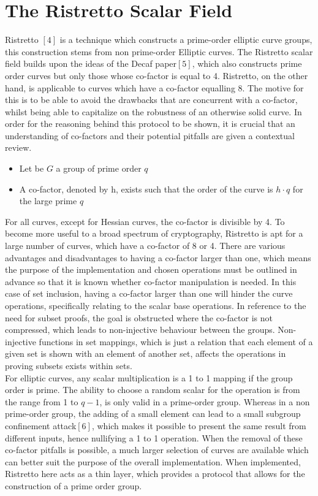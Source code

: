 \documentclass{article}
\begin{document}
\section{The Ristretto Scalar Field}
Ristretto $[4]$ is a technique which constructs a prime-order elliptic curve groups, this construction stems from non prime-order Elliptic curves. The Ristretto scalar field builds upon the ideas of the Decaf paper$[5]$, which also constructs prime order curves but only those whose co-factor is equal to 4. Ristretto, on the other hand, is applicable to curves which have a co-factor equalling 8. The motive for this is to be able to avoid the drawbacks that are concurrent with a co-factor, whilst being able to capitalize on the robustness of an otherwise solid curve. In order for the reasoning behind this protocol to be shown, it is crucial that an understanding of co-factors and their potential pitfalls are given a contextual review. \\
\begin{itemize}
    \item Let be $G$ a group of prime order $q$ 
    \item  A co-factor, denoted by h, exists such that the order of the curve is $h \cdot q$ for the large prime $q$ 
\end{itemize} 
\hfill \break
For all curves, except for Hessian curves, the co-factor is divisible by 4. To become more useful to a broad spectrum of cryptography, Ristretto is apt for a large number of curves, which have a co-factor of 8 or 4. There are various advantages and disadvantages to having a co-factor larger than one, which means the purpose of the implementation and chosen operations must be outlined in advance so that it is known whether co-factor manipulation is needed. In this case of set inclusion, having a co-factor larger than one will hinder the curve operations, specifically relating to the scalar base operations. In reference to the need for subset proofs, the goal is obstructed where the co-factor is not compressed, which leads to non-injective behaviour between the groups. Non-injective functions in set mappings, which is just a relation that each element of a given set is shown with an element of another set, affects the operations in proving subsets exists within sets. \\
For elliptic curves, any scalar multiplication is a 1 to 1 mapping if the group order is prime. The ability to choose a random scalar for the operation is from the range from 1 to $q-1$, is only valid in a prime-order group. Whereas in a non prime-order group, the adding of a small element can lead to a small subgroup confinement attack$[6]$, which makes it possible to present the same result from different inputs, hence nullifying a 1 to 1 operation. When the removal of these co-factor pitfalls is possible, a much larger selection of curves are available which can better suit the purpose of the overall implementation. When implemented, Ristretto here acts as a thin layer, which provides a protocol that allows for the construction of a prime order group.  \\\\
\end{document}
